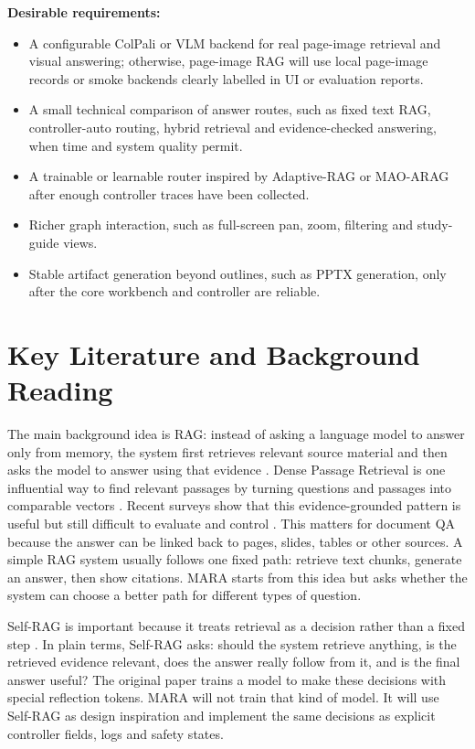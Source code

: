 \documentclass{article}
\begin{document}
\textbf{Desirable requirements:}
\begin{itemize}
  \item A configurable ColPali or VLM backend for real page-image retrieval and visual answering; otherwise, page-image RAG will use local page-image records or smoke backends clearly labelled in UI or evaluation reports.
  \item A small technical comparison of answer routes, such as fixed text RAG, controller-auto routing, hybrid retrieval and evidence-checked answering, when time and system quality permit.
  \item A trainable or learnable router inspired by Adaptive-RAG or MAO-ARAG after enough controller traces have been collected.
  \item Richer graph interaction, such as full-screen pan, zoom, filtering and study-guide views.
  \item Stable artifact generation beyond outlines, such as PPTX generation, only after the core workbench and controller are reliable.
\end{itemize}

\section{Key Literature and Background Reading}

The main background idea is RAG: instead of asking a language model to answer only from memory, the system first retrieves relevant source material and then asks the model to answer using that evidence \cite{lewis2020rag}. Dense Passage Retrieval is one influential way to find relevant passages by turning questions and passages into comparable vectors \cite{karpukhin2020dpr}. Recent surveys show that this evidence-grounded pattern is useful but still difficult to evaluate and control \cite{gao2023rag}. This matters for document QA because the answer can be linked back to pages, slides, tables or other sources. A simple RAG system usually follows one fixed path: retrieve text chunks, generate an answer, then show citations. MARA starts from this idea but asks whether the system can choose a better path for different types of question.

Self-RAG is important because it treats retrieval as a decision rather than a fixed step \cite{asai2023selfrag}. In plain terms, Self-RAG asks: should the system retrieve anything, is the retrieved evidence relevant, does the answer really follow from it, and is the final answer useful? The original paper trains a model to make these decisions with special reflection tokens. MARA will not train that kind of model. It will use Self-RAG as design inspiration and implement the same decisions as explicit controller fields, logs and safety states.
\end{document}

